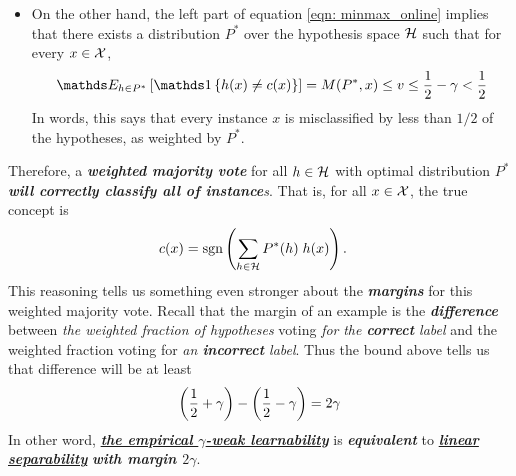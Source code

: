 \documentclass[11pt]{article}
\begin{document}
\begin{itemize}
\begin{remark}
\begin{itemize}
\item On the other hand, the left part of equation \eqref{eqn: minmax_online} implies that there exists a distribution $P^{*}$ over the hypothesis space ${\mathcal H}$ such that for every $x \in {\mathcal X}$,
\begin{align*}
\E{h \in P^{*}}{\ind{h(x) \neq c(x)}} = M(P^{*}, x) \le v \le  \frac{1}{2} - \gamma < \frac{1}{2}
\end{align*}
In words, this says that every instance $x$ is misclassified by less than $1/2$ of the hypotheses, as weighted by $P^{*}$. 
\end{itemize}
Therefore, a \emph{\textbf{weighted majority vote}} for all $h \in {\mathcal H}$ with optimal distribution $P^{*}$ \emph{\textbf{will correctly classify all of instance}s}. That is, for all $x \in {\mathcal X}$, the true concept is 
\begin{align*}
c(x) &= \text{sgn}\left(\sum_{h\in {\mathcal H}}P^{*}(h)\; h(x)\right).
\end{align*} This reasoning tells us something even stronger about the \emph{\textbf{margins}} for this weighted majority vote. Recall that the margin of an example is the \emph{\textbf{difference}} between \emph{the weighted fraction of hypotheses} voting \emph{for} \emph{the \textbf{correct} label} and the weighted fraction voting for \emph{an \textbf{incorrect} label}. Thus the bound above tells us that difference will be at least
\begin{align*}
\left(\frac{1}{2} + \gamma\right) - \left(\frac{1}{2} - \gamma\right) = 2\gamma
\end{align*} In other word, \underline{\emph{\textbf{the empirical $\gamma$-weak learnability}}} is \emph{\textbf{equivalent}} to \underline{\emph{\textbf{linear separability}}} \emph{\textbf{with margin $2\gamma$}}.
\end{remark}
\end{itemize}
\end{document}
